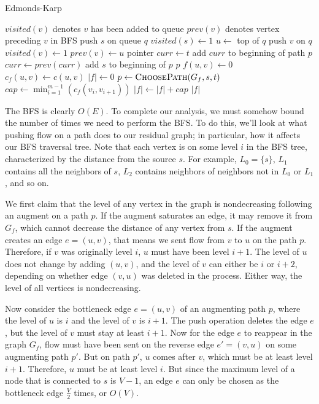 \begin{algorithm}[H]
\caption{Edmonds-Karp}
\begin{algorithmic}
	\State $visited(v)$ denotes $v$ has been added to queue
	\State $prev(v)$ denotes vertex preceding $v$ in BFS
	\State push $s$ on queue $q$
	\State $visited(s) \gets 1$
		\State $u \gets $ top of $q$
			\State push $v$ on $q$
			\State $visited(v) \gets 1$
			\State $prev(v) \gets u$
		\EndFor
	\EndWhile
	\State pointer $curr \gets t$
		\State add $curr$ to beginning of path $p$
		\State $curr \gets prev(curr)$
	\EndWhile
	\State add $s$ to beginning of $p$
	\State \Return $p$
\EndFunction
{}
		\State $f(u,v) \gets 0$
		\State $c_f(u,v) \gets c(u,v)$
	\EndFor
	\State $|f| \gets 0$
		\State $p \gets \Call{ChoosePath}{G_f,s,t}$
		\State $cap \gets \min_{i=1}^{m-1}(c_f(v_i,v_{i+1}))$
		\State $|f| \gets |f| + cap$
		\State {}
	\EndWhile
	\Return $|f|$
\EndFunction
\end{algorithmic}
\end{algorithm}

The BFS is clearly $O(E)$. To complete our analysis, we must somehow bound the number of times we need to perform the BFS. To do this, we'll look at what pushing flow on a path does to our residual graph; in particular, how it affects our BFS traversal tree. Note that each vertex is on some level $i$ in the BFS tree, characterized by the distance from the source $s$. For example, $L_0 = \{s\}$, $L_1$ contains all the neighbors of $s$, $L_2$ contains neighbors of neighbors not in $L_0$ or $L_1$, and so on.

We first claim that the level of any vertex in the graph is nondecreasing following an augment on a path $p$. If the augment saturates an edge, it may remove it from $G_f$, which cannot decrease the distance of any vertex from $s$. If the augment creates an edge $e=(u,v)$, that means we sent flow from $v$ to $u$ on the path $p$. Therefore, if $v$ was originally level $i$, $u$ must have been level $i+1$. The level of $u$ does not change by adding $(u,v)$, and the level of $v$ can either be $i$ or $i+2$, depending on whether edge $(v,u)$ was deleted in the process. Either way, the level of all vertices is nondecreasing.

Now consider the bottleneck edge $e=(u,v)$ of an augmenting path $p$, where the level of $u$ is $i$ and the level of $v$ is $i+1$. The push operation deletes the edge $e$, but the level of $v$ must stay at least $i+1$. Now for the edge $e$ to reappear in the graph $G_f$, flow must have been sent on the reverse edge $e'=(v,u)$ on some augmenting path $p'$. But on path $p'$, $u$ comes after $v$, which must be at least level $i+1$. Therefore, $u$ must be at least level $i$. But since the maximum level of a node that is connected to $s$ is $V-1$, an edge $e$ can only be chosen as the bottleneck edge $\frac{V}{2}$ times, or $O(V)$.

